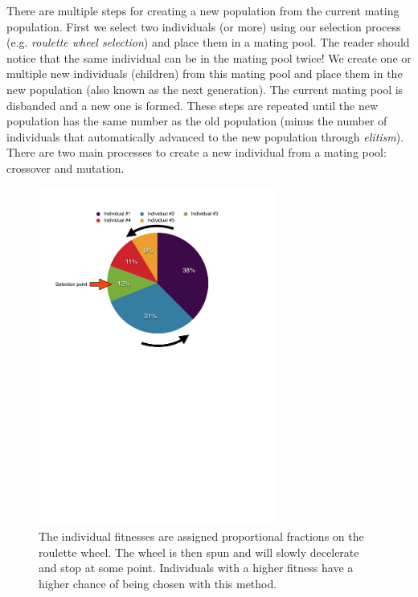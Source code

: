 There are multiple steps for creating a new population from the current mating population. First we select two individuals (or more) using our selection process (e.g. \textit{roulette wheel selection}) and place them in a mating pool. The reader should notice that the same individual can be in the mating pool twice! We create one or multiple new individuals (children) from this mating pool and place them in the new population (also known as the next generation). The current mating pool is disbanded and a new one is formed. These steps are repeated until the new population has the same number as the old population (minus the number of individuals that automatically advanced to the new population through \textit{elitism}). 
There are two main processes to create a new individual from a mating pool: crossover and mutation.
\begin{figure}[htbp] %
   \centering
   \includegraphics[width=0.7\textwidth]{chapter_dalek/plots/rws_cropped.pdf} 
   \caption{The individual fitnesses are assigned proportional fractions on the roulette wheel. The wheel is then spun and will slowly decelerate and stop at some point. Individuals with a higher fitness have a higher chance of being chosen with this method.}
   \label{fig:roulettewheel}
\end{figure}

